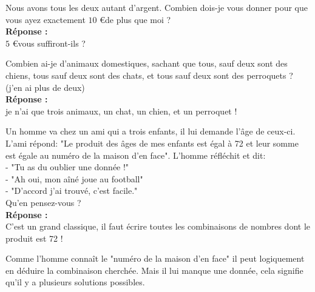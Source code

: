 \documentclass[twocolumn]{article}
\begin{document}
\exo
\par
Nous avons tous les deux autant d'argent. Combien dois-je vous donner pour 
que vous ayez exactement $10$ \euro de plus que moi ?\\

\textbf{Réponse :}\\

$5$ \euro vous suffiront-ils ?

\par
\vspace{3mm}

\exo
\par
Combien ai-je d'animaux domestiques, sachant que tous, sauf deux sont des 
chiens, tous sauf deux sont des chats, et tous sauf deux sont des perroquets ? 
(j'en ai plus de deux)\\

\textbf{Réponse :}\\

je n'ai que trois animaux, un chat, un chien, et un perroquet !

\par
\vspace{3mm}

\exo
\par
Un homme va chez un ami qui a trois enfants, il lui demande l'âge de ceux-ci. L'ami répond: "Le produit des âges de mes enfants est égal à 72 et leur somme est égale au numéro de la maison d'en face". L'homme réfléchit et dit:\\

- "Tu as du oublier une donnée !"\\
- "Ah oui, mon aîné joue au football"\\
- "D'accord j'ai trouvé, c'est facile."\\

Qu'en pensez-vous ?\\

\textbf{Réponse :}\\

C'est un grand classique, il faut écrire toutes les combinaisons de nombres 
dont le produit est 72 !

Comme l'homme connaît le "numéro de la maison d'en face" il peut logiquement 
en déduire la combinaison cherchée. Mais il lui manque une donnée, cela 
signifie qu'il y a plusieurs solutions possibles.
\end{document}
